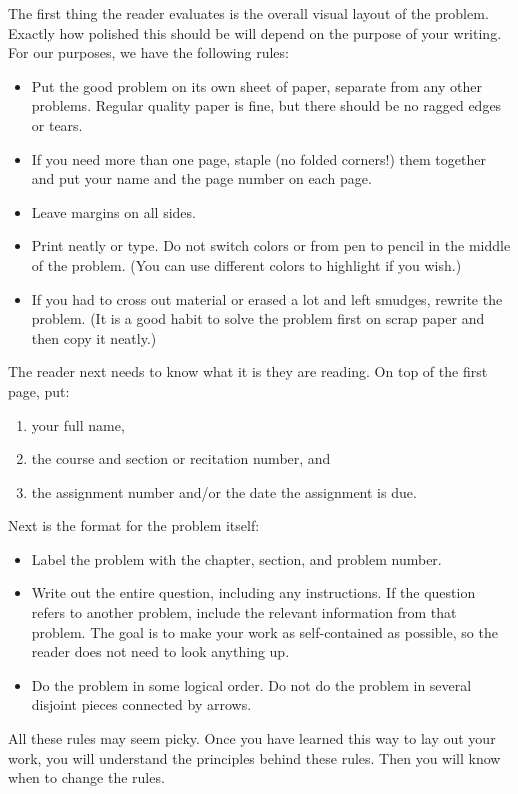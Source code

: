 The first thing the reader evaluates is the overall visual layout of the
problem. Exactly how polished this should be will depend on the purpose of
your writing. For our purposes, we have the following rules:
\begin{itemize}
	\item
Put the good problem on its own sheet of paper, separate from any
other problems. Regular quality paper is fine, 
but there should be no ragged edges or tears.
	\item
If you need more than one page, staple (no folded corners!) them together
and put your name and the page number on each page.
	\item
Leave margins on all sides.
	\item
Print neatly or type. Do not switch colors or from pen to pencil in the
middle of the problem. (You can use different colors to highlight if you wish.)
	\item
If you had to cross out material or erased a lot and left smudges, rewrite
the problem. (It is a good habit to solve the problem first on scrap paper
and then copy it neatly.)
\end{itemize}
%
The reader next needs to know what it is they are reading. On top of the first
page, put:
\begin{enumerate}
	\item
your full name,
	\item
the course and section or recitation number, and
	\item
the assignment number and/or the date the assignment is due.
\end{enumerate}
%
Next is the format for the problem itself:
\begin{itemize}
	\item
Label the problem with the chapter, section, and problem number.
	\item
Write out the entire question, including any instructions. If the question
refers to another problem, include the relevant information from that
problem. The goal is to make your work as self-contained as possible, so
the reader does not need to look anything up. 
	\item
Do the problem in some logical order. Do not do the problem in several
disjoint pieces connected by arrows.
\end{itemize}

All these rules may seem picky. Once you have learned this way to lay out
your work, you will understand the principles behind these rules. Then you
will know when to change the rules.

